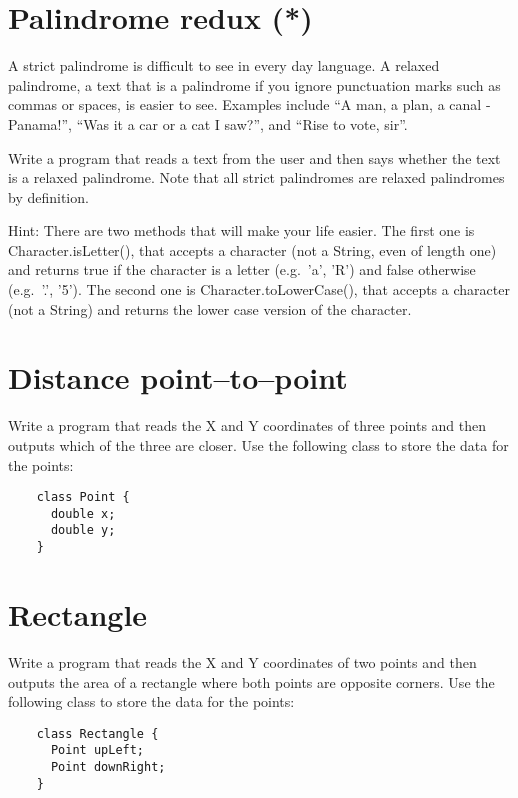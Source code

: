 \documentclass{article}
\begin{document}
\section{Palindrome redux (*)}
\label{sec:palindrome-redux}

A strict palindrome is difficult to see in every day language. A
relaxed palindrome, a text that is a palindrome if you ignore
punctuation marks such as commas or spaces, is easier to see. Examples
include ``A man, a plan, a canal - Panama!'', ``Was it a car or a cat
I saw?'', and ``Rise to vote, sir''. 

Write a program that reads a text from the user and then says whether
the text is a relaxed palindrome. Note that all strict palindromes are
relaxed palindromes by definition. 

Hint: There are two methods that will make your life easier. The first
one is Character.isLetter(), that accepts a character (not a String,
even of length one) and returns true if the character is a letter
(e.g.~'a', 'R') and false otherwise (e.g.~'.', '5'). The second one is
Character.toLowerCase(), that accepts a character (not a String) and
returns the lower case version of the character. 

\section{Distance point--to--point}
\label{sec:distance-point-point}

Write a program that reads the X and Y coordinates of three points and
then outputs which of the three are closer. Use the following class
to store the data for the points: 

\begin{verbatim}
    class Point {
      double x;
      double y;
    }
\end{verbatim}

\section{Rectangle}
\label{sec:rectangle}

Write a program that reads the X and Y coordinates of two points and
then outputs the area of a rectangle where both points are opposite
corners. Use the following class
to store the data for the points: 

\begin{verbatim}
    class Rectangle {
      Point upLeft;
      Point downRight;
    }
\end{verbatim}
\end{document}

